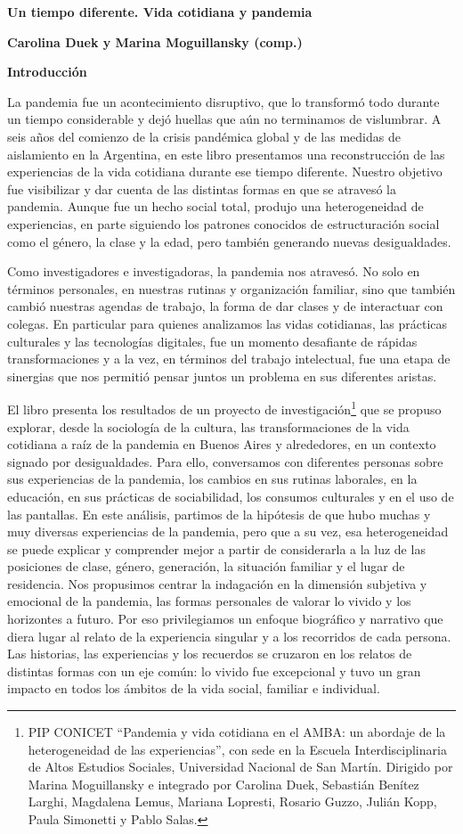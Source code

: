 \textbf{Un tiempo diferente. Vida cotidiana y pandemia}

\textbf{Carolina Duek y Marina Moguillansky (comp.)}

\textbf{Introducción}

La pandemia fue un acontecimiento disruptivo, que lo transformó todo durante un tiempo considerable y dejó huellas que aún no terminamos de vislumbrar. A seis años del comienzo de la crisis pandémica global y de las medidas de aislamiento en la Argentina, en este libro presentamos una reconstrucción de las experiencias de la vida cotidiana durante ese tiempo diferente. Nuestro objetivo fue visibilizar y dar cuenta de las distintas formas en que se atravesó la pandemia. Aunque fue un hecho social total, produjo una heterogeneidad de experiencias, en parte siguiendo los patrones conocidos de estructuración social como el género, la clase y la edad, pero también generando nuevas desigualdades.

Como investigadores e investigadoras, la pandemia nos atravesó. No solo en términos personales, en nuestras rutinas y organización familiar, sino que también cambió nuestras agendas de trabajo, la forma de dar clases y de interactuar con colegas. En particular para quienes analizamos las vidas cotidianas, las prácticas culturales y las tecnologías digitales, fue un momento desafiante de rápidas transformaciones y a la vez, en términos del trabajo intelectual, fue una etapa de sinergias que nos permitió pensar juntos un problema en sus diferentes aristas.

El libro presenta los resultados de un proyecto de investigación\footnote{PIP CONICET ``Pandemia y vida cotidiana en el AMBA: un abordaje de la heterogeneidad de las experiencias'', con sede en la Escuela Interdisciplinaria de Altos Estudios Sociales, Universidad Nacional de San Martín. Dirigido por Marina Moguillansky e integrado por Carolina Duek, Sebastián Benítez Larghi, Magdalena Lemus, Mariana Lopresti, Rosario Guzzo, Julián Kopp, Paula Simonetti y Pablo Salas.} que se propuso explorar, desde la sociología de la cultura, las transformaciones de la vida cotidiana a raíz de la pandemia en Buenos Aires y alrededores, en un contexto signado por desigualdades. Para ello, conversamos con diferentes personas sobre sus experiencias de la pandemia, los cambios en sus rutinas laborales, en la educación, en sus prácticas de sociabilidad, los consumos culturales y en el uso de las pantallas. En este análisis, partimos de la hipótesis de que hubo muchas y muy diversas experiencias de la pandemia, pero que a su vez, esa heterogeneidad se puede explicar y comprender mejor a partir de considerarla a la luz de las posiciones de clase, género, generación, la situación familiar y el lugar de residencia. Nos propusimos centrar la indagación en la dimensión subjetiva y emocional de la pandemia, las formas personales de valorar lo vivido y los horizontes a futuro. Por eso privilegiamos un enfoque biográfico y narrativo que diera lugar al relato de la experiencia singular y a los recorridos de cada persona. Las historias, las experiencias y los recuerdos se cruzaron en los relatos de distintas formas con un eje común: lo vivido fue excepcional y tuvo un gran impacto en todos los ámbitos de la vida social, familiar e individual.

